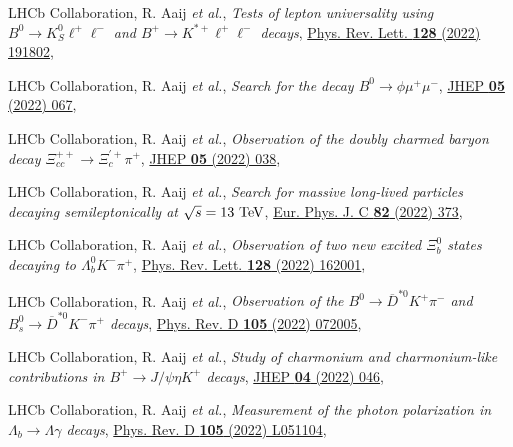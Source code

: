 \begin{cvcontent}
\begin{enumerate}[label={[\arabic*]}, leftmargin=1.5cm]
    \item LHCb Collaboration, R. Aaij \emph{et al.}, 
    \emph{Tests of lepton universality using $B^0\to K^0_S \ell^+ \ell^-$ and $B^+\to K^{*+}\ell^+\ell^-$ decays},
    \href{https://link.aps.org/doi/10.1103/PhysRevLett.128.191802}{Phys. Rev. Lett. \textbf{128} (2022) 191802},
    \item LHCb Collaboration, R. Aaij \emph{et al.},
    \emph{Search for the decay $B^0\to\phi\mu^+\mu^-$},
    \href{https://doi.org/10.1007/JHEP05(2022)067}{JHEP \textbf{05} (2022) 067},
    \item LHCb Collaboration, R. Aaij \emph{et al.},
    \emph{Observation of the doubly charmed baryon decay $\Xi_{cc}^{++}\to \Xi_{c}^{'+}\pi^{+}$},
    \href{https://doi.org/10.1007/JHEP05(2022)038}{JHEP \textbf{05} (2022) 038},
    \item LHCb Collaboration, R. Aaij \emph{et al.}, 
    \emph{Search for massive long-lived particles decaying semileptonically at $\sqrt{s} = 13~\rm{TeV}$},
    \href{https://doi.org/10.1140/epjc/s10052-022-10186-3}{Eur. Phys. J. C \textbf{82} (2022) 373},
    \item LHCb Collaboration, R. Aaij \emph{et al.}, 
    \emph{Observation of two new excited $\Xi_b^0$ states decaying to  $\Lambda_b^0 K^- \pi^+$},
    \href{https://link.aps.org/doi/10.1103/PhysRevLett.128.162001}{Phys. Rev. Lett. \textbf{128} (2022) 162001},
    \item LHCb Collaboration, R. Aaij \emph{et al.}, 
    \emph{Observation of the $B^0\rightarrow\overline{D}^{*0}K^{+}\pi^{-}$ and $B_s^0\rightarrow\overline{D}^{*0}K^{-}\pi^{+}$ decays},
    \href{https://link.aps.org/doi/10.1103/PhysRevD.105.072005}{Phys. Rev. D \textbf{105} (2022) 072005},
    \item LHCb Collaboration, R. Aaij \emph{et al.},
    \emph{Study of charmonium and charmonium-like contributions in $B^+ \rightarrow J/\psi \eta K^+$ decays},
    \href{https://doi.org/10.1007/JHEP04(2022)046}{JHEP \textbf{04} (2022) 046},
    \item LHCb Collaboration, R. Aaij \emph{et al.}, 
    \emph{Measurement of the photon polarization in $\Lambda_b \to \Lambda \gamma$ decays},
    \href{https://link.aps.org/doi/10.1103/PhysRevD.105.L051104}{Phys. Rev. D \textbf{105} (2022) L051104},

\end{enumerate}
\end{cvcontent}
